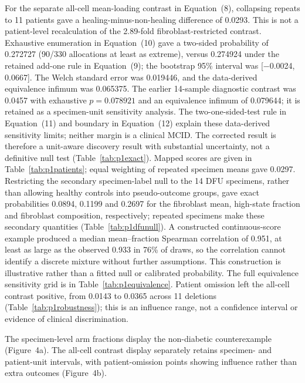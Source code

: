 \documentclass[10pt,a4paper]{article}
\begin{document}
For the separate all-cell mean-loading contrast in Equation~(8), collapsing repeats to 11 patients gave a healing-minus-non-healing difference of 0.0293. This is not a patient-level recalculation of the 2.89-fold fibroblast-restricted contrast. Exhaustive enumeration in Equation~(10) gave a two-sided probability of 0.272727 (90/330 allocations at least as extreme), versus 0.274924 under the retained add-one rule in Equation~(9); the bootstrap 95\% interval was {[}−0.0024, 0.0667{]}. The Welch standard error was 0.019446, and the data-derived equivalence infimum was 0.065375. The earlier 14-sample diagnostic contrast was 0.0457 with exhaustive $p=0.078921$ and an equivalence infimum of 0.079644; it is retained as a specimen-unit sensitivity analysis. The two-one-sided-test rule in Equation~(11) and boundary in Equation~(12) explain these data-derived sensitivity limits; neither margin is a clinical MCID. The corrected result is therefore a unit-aware discovery result with substantial uncertainty, not a definitive null test (Table~\ref{tab:p1exact}). Mapped scores are given in Table~\ref{tab:p1patients}; equal weighting of repeated specimen means gave 0.0297. Restricting the secondary specimen-label null to the 14 DFU specimens, rather than allowing healthy controls into pseudo-outcome groups, gave exact probabilities 0.0894, 0.1199 and 0.2697 for the fibroblast mean, high-state fraction and fibroblast composition, respectively; repeated specimens make these secondary quantities (Table~\ref{tab:p1dfunull}). A constructed continuous-score example produced a median mean--fraction Spearman correlation of 0.951, at least as large as the observed 0.933 in 76\% of draws, so the correlation cannot identify a discrete mixture without further assumptions. This construction is illustrative rather than a fitted null or calibrated probability. The full equivalence sensitivity grid is in Table~\ref{tab:p1equivalence}. Patient omission left the all-cell contrast positive, from 0.0143 to 0.0365 across 11 deletions (Table~\ref{tab:p1robustness}); this is an influence range, not a confidence interval or evidence of clinical discrimination.

The specimen-level arm fractions display the non-diabetic counterexample (Figure~4a\label{call:p1f4}). The all-cell contrast display separately retains specimen- and patient-unit intervals, with patient-omission points showing influence rather than extra outcomes (Figure~4b).
\end{document}
